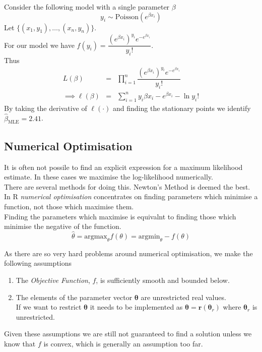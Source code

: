 \documentclass[11pt,a4paper]{article}
\begin{document}
Consider the following model with a single parameter $\beta$
$$y_i\sim\text{Poisson}(e^{\beta x_i})$$
Let $\{(x_1,y_1),\dots,(x_n,y_n)\}$.\\
For our model we have $f(y_i)=\dfrac{(e^{\beta x_i})^{y_i}e^{-e^{\beta x_i}}}{y_i!}$.\\
Thus
\[\begin{array}{rcl}
L(\beta)&=&\displaystyle{\prod_{i=1}^n\dfrac{(e^{\beta x_i})^{y_i}e^{-e^{\beta x_i}}}{y_i!}}\\
\implies\ell(\beta)&=&\sum_{i=1}^ny_i\beta x_i-e^{\beta x_i}-\ln y_i!
\end{array}\]
By taking the derivative of $\ell(\cdot)$ and finding the stationary points we identify $\hat\beta_\text{MLE}=2.41$.

\subsection{Numerical Optimisation}

It is often not possile to find an explicit expression for a maximum likelihood estimate. In these cases we maximise the log-likelihood numerically.\\
There are several methods for doing this. Newton's Method is deemed the best.\\

In R \textit{numerical optimisation} concentrates on finding parameters which minimise a function, not those which maximise them.\\
Finding the parameters which maximise is equivalnt to finding those which minimise the negative of the function.
$$\hat\theta=\text{argmax}_\theta f(\theta)=\text{argmin}_\theta -f(\theta)$$

As there are so very hard problems around numerical optimisation, we make the following assumptions
\begin{enumerate}
	\item The \textit{Objective Function}, $f$, is sufficiently smooth and bounded below.
	\item The elements of the parameter vector $\pmb\theta$ are unrestricted real values.\\
	If we want to restrict $\pmb\theta$ it needs to be implemented as $\pmb\theta=\textbf{r}(\pmb\theta_r)$ where $\pmb\theta_r$ is unrestricted.
\end{enumerate}
\nb Given these assumptions we are still not guaranteed to find a solution unless we know that $f$ is convex, which is generally an assumption too far.
\end{document}
